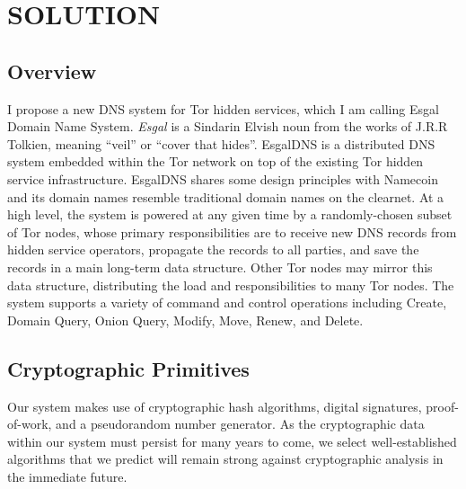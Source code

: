 
\chapter{SOLUTION}

\section{Overview}

I propose a new DNS system for Tor hidden services, which I am calling Esgal Domain Name System. \emph{Esgal} is a Sindarin Elvish noun from the works of J.R.R Tolkien, meaning ``veil'' or ``cover that hides''.\cite{SindarinDict} EsgalDNS is a distributed DNS system embedded within the Tor network on top of the existing Tor hidden service infrastructure. EsgalDNS shares some design principles with Namecoin and its domain names resemble traditional domain names on the clearnet. At a high level, the system is powered at any given time by a randomly-chosen subset of Tor nodes, whose primary responsibilities are to receive new DNS records from hidden service operators, propagate the records to all parties, and save the records in a main long-term data structure. Other Tor nodes may mirror this data structure, distributing the load and responsibilities to many Tor nodes. The system supports a variety of command and control operations including Create, Domain Query, Onion Query, Modify, Move, Renew, and Delete.


\section{Cryptographic Primitives}

Our system makes use of cryptographic hash algorithms, digital signatures, proof-of-work, and a pseudorandom number generator. As the cryptographic data within our system must persist for many years to come, we select well-established algorithms that we predict will remain strong against cryptographic analysis in the immediate future.

